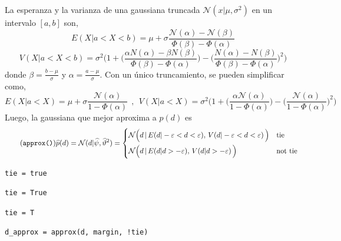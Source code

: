 \documentclass[a4paper,11pt]{book}
\newcommand{\N}{\mathcal{N}}
\theoremstyle{definition}
\begin{document}
%
La esperanza y la varianza de una gaussiana truncada $\N(x|\mu,\sigma^2)$ en un intervalo $[a,b]$ son,
%
\begin{equation}\label{eq:mean_aprox_double}
 E(X| a < X < b) = \mu + \sigma \frac{\N(\alpha) - \N(\beta) }{\Phi(\beta) - \Phi(\alpha) }
\end{equation}
%
\begin{equation}\label{eq:variance_aprox_double}
 V(X| a < X < b) = \sigma^2 \Bigg( 1 + \bigg(\frac{\alpha N(\alpha) - \beta N(\beta) }{\Phi(\beta) - \Phi(\alpha) }\bigg) - \bigg(\frac{N(\alpha) - N(\beta) }{\Phi(\beta) - \Phi(\alpha) }\bigg)^2 \Bigg)
\end{equation}
%
donde $\beta = \frac{b-\mu}{\sigma}$ y $\alpha = \frac{a-\mu}{\sigma}$.
%
Con un \'unico truncamiento, se pueden simplificar como,
%
\begin{equation*}
 E(X| a < X )   =  \mu + \sigma \frac{\N(\alpha)}{1 - \Phi(\alpha) } \ \ , \ \ V(X| a < X )  = \sigma^2 \Bigg( 1 + \bigg(\frac{\alpha \N(\alpha)}{1 - \Phi(\alpha) }\bigg) - \bigg(\frac{\N(\alpha)}{1 - \Phi(\alpha) }\bigg)^2 \Bigg)
\end{equation*}
%
Luego, la gaussiana que mejor aproxima a $p(d)$ es
%
\begin{equation}\label{eq:p*_d} \tag{\texttt{approx()}}
 \widehat{p}(d) = \N(d | \widehat{\psi}, \widehat{\vartheta}^2) =
 \begin{cases*}
 \N\Big(d \,  | \, E(d | -\varepsilon < d < \varepsilon ) , \,  V(d | -\varepsilon < d < \varepsilon ) \, \Big) & \text{tie} \\
\N\Big(d \,  | \, E(d | d > -\varepsilon ) , \,  V(d | d > -\varepsilon ) \, \Big) & \text{not tie}
  \end{cases*}
\end{equation}
%
\begin{paracol}{3}
\begin{lstlisting}[backgroundcolor=\color{julia!60},belowskip=0cm]
tie = true
\end{lstlisting}
\switchcolumn
\begin{lstlisting}[backgroundcolor=\color{python!60},belowskip=0cm]
tie = True
\end{lstlisting}
\switchcolumn
\begin{lstlisting}[backgroundcolor=\color{r!50},belowskip=0cm]
tie = T
\end{lstlisting}
\end{paracol}
\begin{lstlisting}[captionpos=b,backgroundcolor=\color{all},label=lst:d_approx, caption={Computando la aproximaci\'on de la diferencia de desempe\~nos},belowskip=0cm,aboveskip=0cm]
d_approx = approx(d, margin, !tie)
\end{lstlisting}
\end{document}
